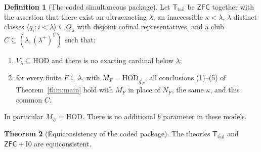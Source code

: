 \documentclass[11pt,letterpaper]{article}
\theoremstyle{definition}
\newtheorem{definition}{Definition}[section]
\newtheorem{theorem}[definition]{Theorem}
\numberwithin{equation}{section}
\newcommand{\ZFC}{\mathsf{ZFC}}
\newcommand{\HOD}{\mathrm{HOD}}
\newcommand{\Izero}{\mathrm{I0}}
\begin{document}
\begin{definition}[The coded simultaneous package]\label{def:package}
Let $\mathsf T_{\mathrm{tail}}$ be $\ZFC$ together with the assertion that there exist an ultraexacting $\lambda$, an inaccessible $\kappa<\lambda$, $\lambda$ distinct classes $\langle q_i:i<\lambda\rangle\subseteq Q_\lambda$ with disjoint cofinal representatives, and a club $C\subseteq(\lambda,(\lambda^+)^V)$ such that:
\begin{enumerate}[label=\textup{(\alph*)}]
\item $V_\lambda\subseteq\HOD$ and there is no exacting cardinal below $\lambda$;
\item for every finite $F\subseteq\lambda$, with $M_F=\HOD_{\vec q_F}$, all conclusions (1)--(5) of Theorem~\ref{thm:main} hold with $M_F$ in place of $N_F$, the same $\kappa$, and this common $C$.
\end{enumerate}
In particular $M_\varnothing=\HOD$. There is no additional $b$ parameter in these models.
\end{definition}

\begin{theorem}[Equiconsistency of the coded package]\label{thm:equiconsistency}
The theories $\mathsf T_{\mathrm{tail}}$ and $\ZFC+\Izero$ are equiconsistent.
\end{theorem}
\end{document}
